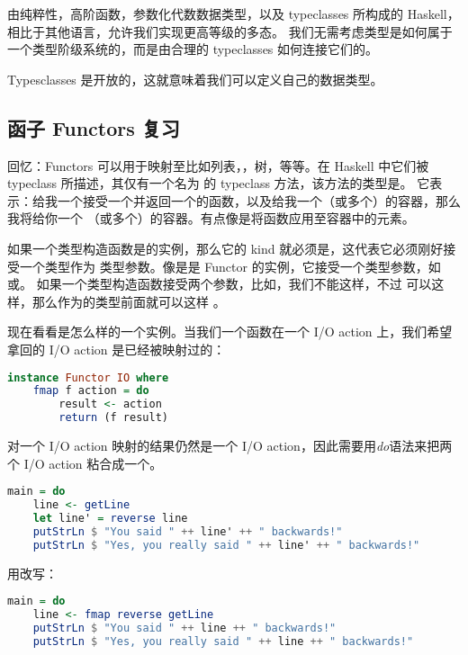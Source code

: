 \documentclass[./main.tex]{subfiles}
\begin{document}
由纯粹性，高阶函数，参数化代数数据类型，以及 typeclasses 所构成的 Haskell，相比于其他语言，允许我们实现更高等级的多态。
我们无需考虑类型是如何属于一个类型阶级系统的，而是由合理的 typeclasses 如何连接它们的。

Typesclasses 是开放的，这就意味着我们可以定义自己的数据类型。

\subsection*{函子 Functors 复习}

回忆：Functors 可以用于映射至比如列表，，树，等等。在 Haskell 中它们被  typeclass
所描述，其仅有一个名为  的 typeclass 方法，该方法的类型是。
它表示：给我一个接受一个并返回一个的函数，以及给我一个（或多个）的容器，那么我将给你一个
（或多个）的容器。有点像是将函数应用至容器中的元素。

如果一个类型构造函数是的实例，那么它的 kind 就必须是\acode{* -> *}，这代表它必须刚好接受一个类型作为
类型参数。像是是 Functor 的实例，它接受一个类型参数，如或。
如果一个类型构造函数接受两个参数，比如，我们不能这样，不过
可以这样，那么作为的类型前面就可以这样
。

现在看看是怎么样的一个实例。当我们一个函数在一个 I/O action 上，我们希望
拿回的 I/O action 是已经被映射过的：

\begin{lstlisting}[language=Haskell]
  instance Functor IO where
    fmap f action = do
        result <- action
        return (f result)
\end{lstlisting}

对一个 I/O action 映射的结果仍然是一个 I/O action，因此需要用\textit{do}语法来把两个 I/O action 粘合成一个。

\begin{lstlisting}[language=Haskell]
  main = do
    line <- getLine
    let line' = reverse line
    putStrLn $ "You said " ++ line' ++ " backwards!"
    putStrLn $ "Yes, you really said " ++ line' ++ " backwards!"
\end{lstlisting}

用改写：

\begin{lstlisting}[language=Haskell]
  main = do
    line <- fmap reverse getLine
    putStrLn $ "You said " ++ line ++ " backwards!"
    putStrLn $ "Yes, you really said " ++ line ++ " backwards!"
\end{lstlisting}
\end{document}
